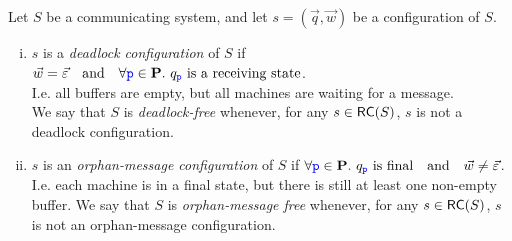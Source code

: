 \begin{definition}%
\label{def:safeness}
Let $S$ be a communicating system, and let $s= (\vec{q},\vec{w})$ be a configuration of $S$.
\begin{enumerate}[i)]
\item
\label{def:safeness-i}
$s$ is a {\em deadlock configuration} of $S$ if \hspace{2mm}
$\vec{w}=\vec{\varepsilon}\quad\text{and}\quad \forall { \ensuremath{\mathtt{\color{blue}{ {p}}}} }\in\mathbf{P}.~q_{\mathtt{\color{blue}{ {p}}}} \text{ is a receiving state}$.\\
I.e. all buffers are empty, but all machines are waiting for a message.\\
We say that $S$ is {\em deadlock-free} whenever, for any $s\in \mathsf{RC}(S)$, $s$ is not a  deadlock configuration.


\item
$s$ is an {\em  orphan-message  configuration} of $S$ if \hspace{2mm}
$\forall { \ensuremath{\mathtt{\color{blue}{ {p}}}} }\in\mathbf{P}. ~ q_{\mathtt{\color{blue}{ {p}}}} \text{ is final} \quad\text{and}\quad  \vec{w}\neq \vec{\varepsilon}$.\\
I.e. each machine is in a final state, but there is still  at least one non-empty buffer.
We say that $S$ is {\em orphan-message free} whenever, for any $s\in \mathsf{RC}(S)$, $s$ is not an orphan-message configuration.


\end{enumerate}
\end{definition}
